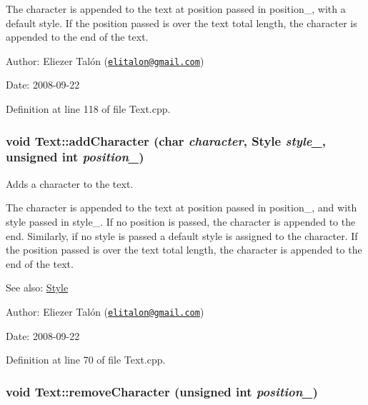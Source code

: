 The character is appended to the text at position passed in position\_\-, with a default style. If the position passed is over the text total length, the character is appended to the end of the text.

\begin{Desc}
\item[Author:]Eliezer Talón (\href{mailto:elitalon@gmail.com}{\tt elitalon@gmail.com}) \end{Desc}
\begin{Desc}
\item[Date:]2008-09-22 \end{Desc}


Definition at line 118 of file Text.cpp.\hypertarget{class_text_254e6cce10d3ed94b8a5969c6d21af57}{
\subsubsection[addCharacter]{\setlength{\rightskip}{0pt plus 5cm}void Text::addCharacter (char {\em character}, \/  {\bf Style} {\em style\_\-}, \/  unsigned int {\em position\_\-})}}
\label{class_text_254e6cce10d3ed94b8a5969c6d21af57}


Adds a character to the text. 

The character is appended to the text at position passed in position\_\-, and with style passed in style\_\-. If no position is passed, the character is appended to the end. Similarly, if no style is passed a default style is assigned to the character. If the position passed is over the text total length, the character is appended to the end of the text.

\begin{Desc}
\item[See also:]\hyperlink{class_style}{Style}\end{Desc}
\begin{Desc}
\item[Author:]Eliezer Talón (\href{mailto:elitalon@gmail.com}{\tt elitalon@gmail.com}) \end{Desc}
\begin{Desc}
\item[Date:]2008-09-22 \end{Desc}


Definition at line 70 of file Text.cpp.\hypertarget{class_text_8f38ee63a6b7706d5822ee98ac6413bc}{
\subsubsection[removeCharacter]{\setlength{\rightskip}{0pt plus 5cm}void Text::removeCharacter (unsigned int {\em position\_\-})}}
\label{class_text_8f38ee63a6b7706d5822ee98ac6413bc}


